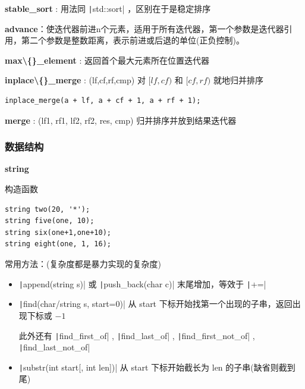 \documentclass[twocolumn,10pt]{ctexart}
\makeatletter
\newcommand{\hfive}[1]{\par\addvspace{6pt}\@afterindentfalse
  {\noindent\bfseries\normalsize #1}\par\nobreak\vspace{2pt}}
\makeatother
\begin{document}
\textbf{stable\_sort} : 用法同 \texttt|std::sort| ，区别在于是稳定排序

\textbf{advance}：使迭代器前进n个元素，适用于所有迭代器，第一个参数是迭代器引用，第二个参数是整数距离，表示前进或后退的单位(正负控制)。

\textbf{max\textbackslash\{\}\_element} : 返回首个最大元素所在位置迭代器

\textbf{inplace\textbackslash\{\}\_merge} : (lf,cf,rf,cmp) 对 $[lf,cf)$ 和 $[cf,rf)$ 就地归并排序

\begin{verbatim}
inplace_merge(a + lf, a + cf + 1, a + rf + 1);
\end{verbatim}

\textbf{merge} : (lf1, rf1, lf2, rf2, res, cmp) 归并排序并放到结果迭代器

\subsubsection{数据结构}

\hfive{string}

构造函数

\begin{verbatim}
string two(20, '*');
string five(one, 10);
string six(one+1,one+10);
string eight(one, 1, 16);
\end{verbatim}

常用方法：(复杂度都是暴力实现的复杂度)

\begin{itemize}
\item \texttt|append(string s)| 或 \texttt|push_back(char c)| 末尾增加，等效于 \texttt|+=|
\end{itemize}

\begin{itemize}
\item \texttt|find(char/string s, start=0)| 从 start 下标开始找第一个出现的子串，返回出现下标或 $-1$

此外还有 \texttt|find_first_of| , \texttt|find_last_of| , \texttt|find_first_not_of| , \texttt|find_last_not_of|
\end{itemize}

\begin{itemize}
\item \texttt|substr(int start[, int len])| 从 start 下标开始截长为 len 的子串(缺省则截到尾)
\end{itemize}
\end{document}
